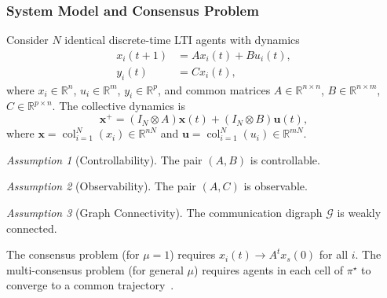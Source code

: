 \documentclass[12pt]{elsarticle}
\theoremstyle{remark}
\newtheorem{assumption}{Assumption}
\DeclareMathOperator{\col}{col}
\newcommand{\R}{\mathbb{R}}
\newcommand{\bx}{\boldsymbol{x}}
\newcommand{\bu}{\boldsymbol{u}}
\begin{document}
\subsubsection{System Model and Consensus Problem}
\label{subsec:system}
Consider $N$ identical discrete-time LTI agents with dynamics
\begin{align}
x_i(t+1) &= A x_i(t) + B u_i(t), \label{eq:agent_state} \\
y_i(t) &= C x_i(t), \label{eq:agent_output}
\end{align}
where $x_i \in \R^n$, $u_i \in \R^m$, $y_i \in \R^p$, and common matrices $A \in \R^{n \times n}$, $B \in \R^{n \times m}$, $C \in \R^{p \times n}$. The collective dynamics is
\begin{equation}
\bx^+ = (I_N \otimes A)\bx(t) + (I_N \otimes B)\bu(t),
\label{eq:collective}
\end{equation}
where $\bx = \col_{i=1}^N(x_i) \in \R^{nN}$ and $\bu = \col_{i=1}^N(u_i) \in \R^{mN}$.
\begin{assumption}[Controllability]
\label{ass:controllable}
The pair $(A, B)$ is controllable.
\end{assumption}
\begin{assumption}[Observability]
\label{ass:observable}
The pair $(A, C)$ is observable.
\end{assumption}
\begin{assumption}[Graph Connectivity]
\label{ass:graph}
The communication digraph $\mathcal{G}$ is weakly connected.
\end{assumption}
The consensus problem (for $\mu = 1$) requires $x_i(t) \to A^t x_s(0)$ for all $i$. The multi-consensus problem (for general $\mu$) requires agents in each cell of $\pi^\star$ to converge to a common trajectory~\cite{cacace2024}.
\end{document}
